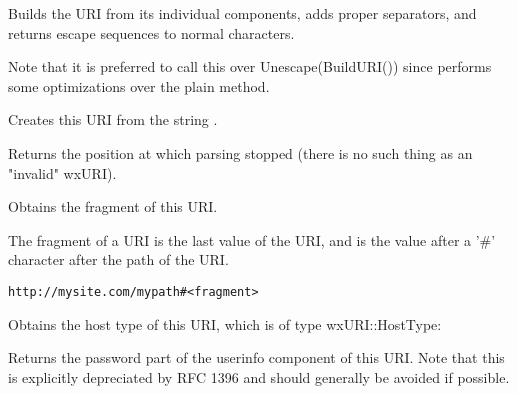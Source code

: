 
Builds the URI from its individual components, adds proper separators, and
returns escape sequences to normal characters.

Note that it is preferred to call this over Unescape(BuildURI()) since
 performs some optimizations over the plain method.


\label{wxuricreate}


Creates this URI from the string .

Returns the position at which parsing stopped (there 
is no such thing as an "invalid" wxURI).



\label{wxurigetfragment}


Obtains the fragment of this URI.

The fragment of a URI is the last value of the URI,
and is the value after a '#' character after the path 
of the URI.

\tt{http://mysite.com/mypath\#<fragment>}

\label{wxurigethosttype}


Obtains the host type of this URI, which is of type
wxURI::HostType:

\twocolwidtha{7cm}
\begin{twocollist}\itemsep=0pt
\end{twocollist}


\label{wxurigetpassword}


Returns the password part of the userinfo component of
this URI.  Note that this is explicitly depreciated by
RFC 1396 and should generally be avoided if possible.

